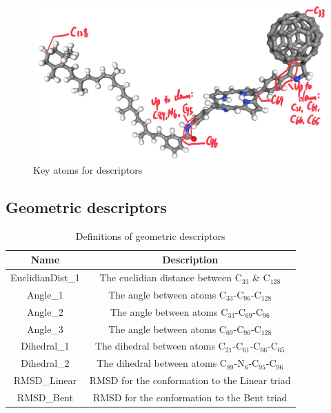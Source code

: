 \documentclass[a4paper]{article}
\begin{document}
\begin{figure}[H]
    \centering
    \includegraphics[width=0.75\linewidth]{projects/Gustave_Li/Docs/Key-atoms.jpg}
    \caption{Key atoms for descriptors}
    \label{fig:key_atoms}
\end{figure}

\subsection{Geometric descriptors}
\begin{table}[ht]
    \centering
    \caption{Definitions of geometric descriptors}
    \begin{tabular}{c|c}
    \hline \hline
       \textbf{Name}  & \textbf{Description} \\
       \hline \hline
       EuclidianDist\_1 & The euclidian distance between \(\text{C}_{33}\) \& \(\text{C}_{128}\) \\
       Angle\_1 & The angle between atoms \(\text{C}_{33}\)-\(\text{C}_{96}\)-\(\text{C}_{128}\) \\
       Angle\_2 & The angle between atoms \(\text{C}_{33}\)-\(\text{C}_{69}\)-\(\text{C}_{96}\) \\
       Angle\_3 & The angle between atoms \(\text{C}_{69}\)-\(\text{C}_{96}\)-\(\text{C}_{128}\) \\
       Dihedral\_1 & The dihedral between atoms \(\text{C}_{21}\)-\(\text{C}_{61}\)-\(\text{C}_{66}\)-\(\text{C}_{65}\) \\
       Dihedral\_2 & The dihedral between atoms \(\text{C}_{89}\)-\(\text{N}_{6}\)-\(\text{C}_{95}\)-\(\text{C}_{96}\) \\
       RMSD\_Linear & RMSD for the conformation to the Linear triad \\
       RMSD\_Bent & RMSD for the conformation to the Bent triad \\
       \hline \hline
    \end{tabular}
    
    \label{tab:descriptors}
\end{table}

\pagebreak


\end{document}
